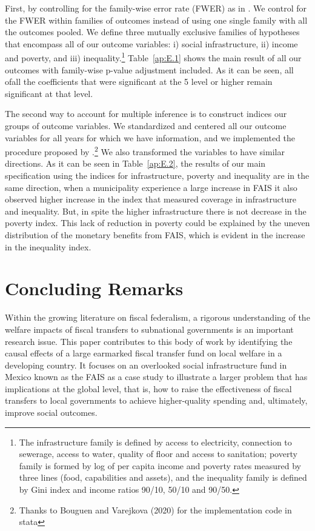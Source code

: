 \documentclass[dv_diss_main.tex]{subfiles}
\begin{document}
 First, by controlling for the family-wise error rate (FWER) as in \cite{jones2019workplace}. We control for the FWER within families of outcomes instead of using one single family with all the outcomes pooled. We define three mutually exclusive families of hypotheses that encompass all of our outcome variables: i) social infrastructure, ii) income and poverty, and iii) inequality.\footnote{The infrastructure family is defined by access to electricity, connection to sewerage, access to water, quality of floor and access to sanitation; poverty family is formed by log of per capita income and poverty rates measured by three lines (food, capabilities and assets), and the inequality family is defined by Gini index and income ratios 90/10, 50/10 and 90/50.}  Table~\ref{ap:E.1} shows the main result of all our outcomes with family-wise p-value adjustment included. As it can be seen, all ofall the coefficients that were significant at the 5 level or higher remain significant at that level.  

The second way to account for multiple inference is to construct indices our groups of outcome variables. We standardized and centered all our outcome variables for all years for which we have information, and we implemented the procedure proposed by \cite{anderson2008multiple}.\footnote{Thanks to Bouguen and Varejkova (2020) for the implementation code in stata} We also transformed the variables to have similar directions. As it can be seen in {Table}~\ref{ap:E.2}, the results of our main specification using the indices for infrastructure, poverty and inequality are in the same direction, when a municipality experience a large increase in FAIS it also observed higher increase in the index that measured coverage in infrastructure and inequality. But, in spite the higher infrastructure there is not decrease in the poverty index. This lack of reduction in poverty could be explained by the uneven distribution of the monetary benefits from FAIS, which is evident in the increase in the inequality index. 

\section{Concluding Remarks} \label{sec: Concluding remarks}

Within the growing literature on fiscal federalism, a rigorous understanding of the welfare impacts of fiscal transfers to subnational governments is an important research issue. This paper contributes to this body of work by identifying the causal effects of a large earmarked fiscal transfer fund on local welfare in a developing country. It focuses on an overlooked social infrastructure fund in Mexico known as the FAIS as a case study to illustrate a larger problem that has implications at the global level, that is, how to raise the effectiveness of fiscal transfers to local governments to achieve higher-quality spending and, ultimately, improve social outcomes.
\end{document}
